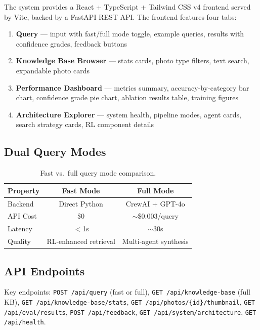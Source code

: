 \documentclass[11pt,letterpaper]{article}
\begin{document}
The system provides a React + TypeScript + Tailwind CSS v4 frontend served by Vite, backed by a FastAPI REST API. The frontend features four tabs:

\begin{enumerate}[nosep]
  \item \textbf{Query} --- input with fast/full mode toggle, example queries, results with confidence grades, feedback buttons
  \item \textbf{Knowledge Base Browser} --- stats cards, photo type filters, text search, expandable photo cards
  \item \textbf{Performance Dashboard} --- metrics summary, accuracy-by-category bar chart, confidence grade pie chart, ablation results table, training figures
  \item \textbf{Architecture Explorer} --- system health, pipeline modes, agent cards, search strategy cards, RL component details
\end{enumerate}

\subsection{Dual Query Modes}

\begin{table}[H]
\centering
\begin{tabular}{lcc}
\toprule
\textbf{Property} & \textbf{Fast Mode} & \textbf{Full Mode} \\
\midrule
Backend & Direct Python & CrewAI + GPT-4o \\
API Cost & \$0 & $\sim$\$0.003/query \\
Latency & $<$1s & $\sim$30s \\
Quality & RL-enhanced retrieval & Multi-agent synthesis \\
\bottomrule
\end{tabular}
\caption{Fast vs.\ full query mode comparison.}
\end{table}

\subsection{API Endpoints}

Key endpoints: \texttt{POST /api/query} (fast or full), \texttt{GET /api/knowledge-base} (full KB), \texttt{GET /api/knowledge-base/stats}, \texttt{GET /api/photos/\{id\}/thumbnail}, \texttt{GET /api/eval/results}, \texttt{POST /api/feedback}, \texttt{GET /api/system/architecture}, \texttt{GET /api/health}.
\end{document}
